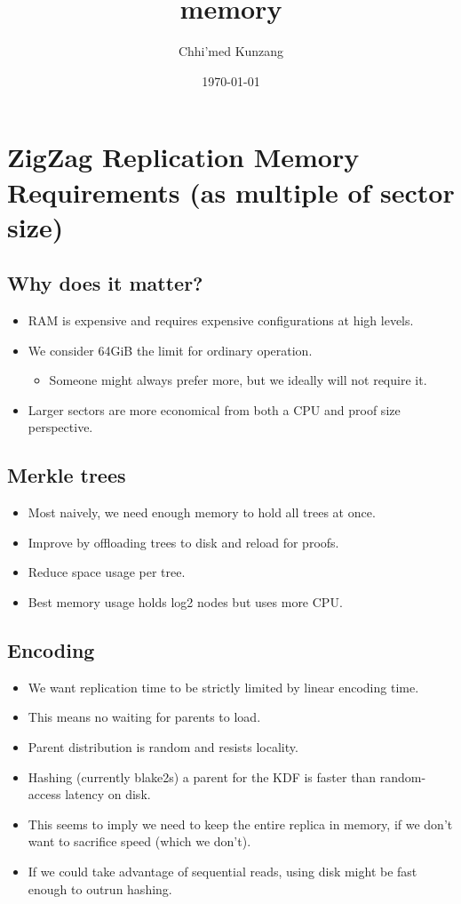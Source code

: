 \documentclass[11pt]{article}
\author{Chhi'med Kunzang}
\date{\today}
\title{memory}
\begin{document}
\maketitle
\tableofcontents


\section{ZigZag Replication Memory Requirements (as multiple of sector size)}
\label{sec-1}
\subsection{Why does it matter?}
\label{sec-1-1}
\begin{itemize}
\item RAM is expensive and requires expensive configurations at high levels.
\item We consider 64GiB the limit for ordinary operation.
\begin{itemize}
\item Someone might always prefer more, but we ideally will not require it.
\end{itemize}
\item Larger sectors are more economical from both a CPU and proof size perspective.
\end{itemize}
\subsection{Merkle trees}
\label{sec-1-2}
\begin{itemize}
\item Most naively, we need enough memory to hold all trees at once.
\item Improve by offloading trees to disk and reload for proofs.
\item Reduce space usage per tree.
\item Best memory usage holds log2 nodes but uses more CPU.
\end{itemize}
\subsection{Encoding}
\label{sec-1-3}
\begin{itemize}
\item We want replication time to be strictly limited by linear encoding time.
\item This means no waiting for parents to load.
\item Parent distribution is random and resists locality.
\item Hashing (currently blake2s) a parent for the KDF is faster than random-access latency on disk.
\item This seems to imply we need to keep the entire replica in memory, if we don't want to sacrifice speed (which we don't).
\item If we could take advantage of sequential reads, using disk might be fast enough to outrun hashing.
\end{itemize}
\end{document}
